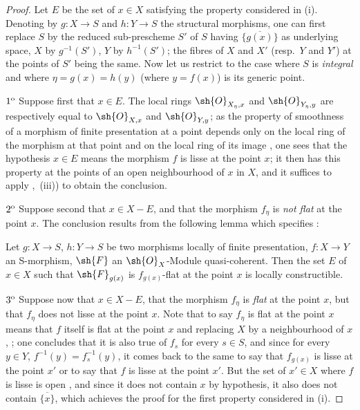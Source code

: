 
\begin{proof}
Let $E$ be the set of $x\in X$ satisfying the property considered in (i).
Denoting by $g:X\to S$ and $h:Y\to S$ the structural morphisms, one can first replace $S$ by the reduced sub-prescheme $S'$ of $S$ having $\overline{\{g(x)\}}$ as underlying space, $X$ by $g^{-1}(S')$, $Y$ by $h^{-1}(S')$; the fibres of $X$ and $X'$ (resp.\ $Y$ and $Y'$) at the points of $S'$ being the same.
Now let us restrict to the case where $S$ is \emph{integral} and where $\eta=g(x)=h(y)$ (where $y=f(x)$) is its generic point.

$1\textsuperscript{o}$
Suppose first that $x\in E$.
The local rings $\sh{O}_{X_{\eta},x}$ and $\sh{O}_{Y_{\eta},y}$ are respectively equal to $\sh{O}_{X,x}$ and $\sh{O}_{Y,y}$; as the property of smoothness of a morphism of finite presentation at a point depends only on the local ring of the morphism at that point and on the local ring of its image , one sees that the hypothesis $x\in E$ means the morphism $f$ is lisse at the point $x$; it then has this property at the points of an open neighbourhood of $x$ in $X$, and it suffices to apply ,~(iii)) to obtain the conclusion.

$2\textsuperscript{o}$
Suppose second that $x\in X-E$, and that the morphism $f_\eta$ is \emph{not flat} at the point $x$.
The conclusion results from the following lemma which specifies :

\begin{lemma}[17.7.11.1]
\label{IV.17.7.11.1}
Let $g:X\to S$, $h:Y\to S$ be two morphisms locally of finite presentation, $f:X\to Y$ an S-morphism, $\sh{F}$ an $\sh{O}_X$-Module quasi-coherent.
Then the set $E$ of $x\in X$ such that $\sh{F}_{g(x)}$ is $f_{g(x)}$-flat at the point $x$ is locally constructible.
\end{lemma}

$3\textsuperscript{o}$
Suppose now that $x\in X-E$, that the morphism $f_\eta$ is \emph{flat} at the point $x$, but that $f_\eta$ does not lisse at the point $x$.
Note that to say $f_\eta$ is flat at the point $x$ means that $f$ itself is flat at the point $x$ and replacing $X$ by a neighbourhood of $x$, ; one concludes that it is also true of $f_s$ for every $s\in S$, and since for every $y\in Y$, $f^{-1}(y)=f_s^{-1}(y)$, it comes back to the same to say that $f_{g(x)}$ is lisse at the point $x'$ or to say that $f$ is lisse at the point $x'$.
But the set of $x'\in X$ where $f$ is lisse is open , and since it does not contain $x$ by hypothesis, it also does not contain $\overline{\{x\}}$, which achieves the proof for the first property considered in (i).


\end{proof}

